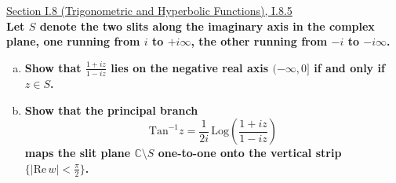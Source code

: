 \documentclass[11pt]{article}
\newcommand{\C}{\mathbb{C}}
\theoremstyle{definition}
\begin{document}
\newpage

\underline{Section I.8 (Trigonometric and Hyperbolic Functions), I.8.5} \\

\textbf{Let $S$ denote the two slits along the imaginary axis in the complex plane, one running from $i$ to $+i\infty$, the other running from $-i$ to $-i\infty$.}

\begin{enumerate}[a)]
\item \textbf{Show that $\frac{1+iz}{1-iz}$ lies on the negative real axis $(-\infty, 0]$ if and only if $z \in S$.}
\item \textbf{Show that the principal branch 
\[ \mathrm{Tan}^{-1} z = \frac{1}{2i} \, \mathrm{Log} \left( \frac{1+iz}{1-iz} \right) \]
maps the slit plane $\C \setminus S$ one-to-one onto the vertical strip $\{ | \mathrm{Re} \, w | < \frac{\pi}{2}\}$.}
\end{enumerate}
\end{document}

